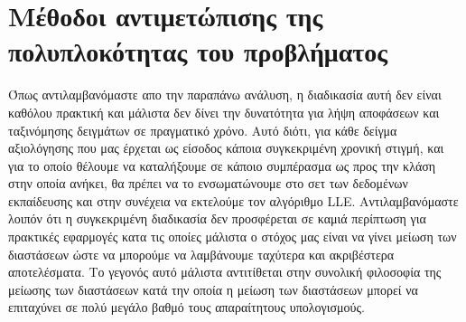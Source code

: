 \section{Μέθοδοι αντιμετώπισης της πολυπλοκότητας του προβλήματος}
\par
Όπως αντιλαμβανόμαστε απο την παραπάνω ανάλυση, η διαδικασία αυτή δεν είναι καθόλου πρακτική και μάλιστα δεν δίνει την δυνατότητα για λήψη αποφάσεων και ταξινόμησης δειγμάτων σε πραγματικό χρόνο. Αυτό διότι, για κάθε δείγμα αξιολόγησης που μας έρχεται ως είσοδος κάποια συγκεκριμένη χρονική στιγμή, και για το οποίο θέλουμε να καταλήξουμε σε κάποιο συμπέρασμα ως προς την κλάση στην οποία ανήκει, θα πρέπει να το ενσωματώνουμε στο σετ των δεδομένων εκπαίδευσης και στην συνέχεια να εκτελούμε τον αλγόριθμο \textlatin{LLE}. Αντιλαμβανόμαστε λοιπόν ότι η συγκεκριμένη διαδικασία δεν προσφέρεται σε καμιά περίπτωση για πρακτικές εφαρμογές κατα τις οποίες μάλιστα ο στόχος μας είναι να γίνει μείωση των διαστάσεων ώστε να μπορούμε να λαμβάνουμε ταχύτερα και ακριβέστερα αποτελέσματα. Το γεγονός αυτό μάλιστα αντιτίθεται στην συνολική φιλοσοφία της μείωσης των διαστάσεων κατά την οποία η μείωση των διαστάσεων μπορεί να επιταχύνει σε πολύ μεγάλο βαθμό τους απαραίτητους υπολογισμούς.

